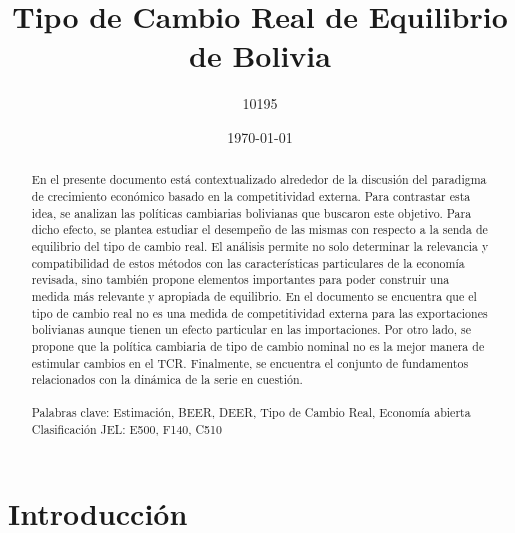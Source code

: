 \documentclass[12pt,letterpaper]{article}
\title{Tipo de Cambio Real de Equilibrio de Bolivia}
\author{10195}
\date{\today}
\begin{document}
 

\maketitle 

\begin{abstract}
\singlespacing

En el presente documento está contextualizado alrededor de la discusión del paradigma de crecimiento económico basado en la competitividad externa. Para contrastar esta idea, se analizan las políticas cambiarias bolivianas que buscaron este objetivo. Para dicho efecto, se plantea estudiar el desempeño de las mismas con respecto a la senda de equilibrio del tipo de cambio real. El análisis permite no solo determinar la relevancia y compatibilidad de estos métodos con las características particulares de la economía revisada, sino también propone elementos importantes para poder construir una medida más relevante y apropiada de equilibrio. En el documento se encuentra que el tipo de cambio real no es una medida de competitividad externa para las exportaciones bolivianas aunque tienen un efecto particular en las importaciones. Por otro lado, se propone que la política cambiaria de tipo de cambio nominal no es la mejor manera de estimular cambios en el TCR. Finalmente, se encuentra el conjunto de fundamentos relacionados con la dinámica de la serie en cuestión.
\\
\\
\bigskip
Palabras clave: Estimación, BEER, DEER, Tipo de Cambio Real, Economía abierta \\
Clasificación JEL: E500, F140, C510

\end{abstract}

\newpage

\section{Introducción}

\end{document}
